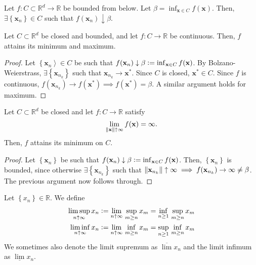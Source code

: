 \begin{prop}
    Let $f \colon C \subset \mathbb{R}^d \to \mathbb{R}$ be bounded from below. Let $\beta = \inf_{\mathbf{x} \in C} f(\mathbf{x})$. Then, $\exists \left\{ \mathbf{x}_n \right\} \in C$ such that $f(\mathbf{x}_n) \downarrow \beta$.  
\end{prop}

\begin{thm}
    Let $C \subset \mathbb{R}^d$ be closed and bounded, and let $f \colon C \to \mathbb{R}$ be continuous. Then, $f$ attains its minimum and maximum. 
\end{thm}
\begin{proof}
    Let $\left\{ \mathbf{x}_n \right\rangle \in C$ be such that $f(\mathbf{x}_n) \downarrow \beta \vcentcolon= \inf_{\mathbf{x} \in C} f(\mathbf{x})$. By Bolzano-Weierstrass, $\exists \left\{ \mathbf{x}_{n_k} \right\}$ such that $\mathbf{x}_{n_k} \to \mathbf{x}^*$. Since $C$ is closed, $\mathbf{x}^* \in C$. Since $f$ is continuous, $f(\mathbf{x}_{n_k}) \to f(\mathbf{x}^*) \implies f(\mathbf{x}^*) = \beta$. A similar argument holds for maximum.
\end{proof}

\begin{cor}
    Let $C \subset \mathbb{R}^d$ be closed and let $f \colon C \to \mathbb{R}$ satisfy 
    \[
        \lim_{\norm{\mathbf{x}} \uparrow \infty} f(\mathbf{x}) = \infty.
    \]
    Then, $f$ attains its minimum on $C$. 
\end{cor}
\begin{proof}
    Let $\left\{ \mathbf{x}_n \right\}$ be such that $f(\mathbf{x}_n) \downarrow \beta \vcentcolon= \inf_{\mathbf{x} \in C} f(\mathbf{x})$. Then, $\left\{ \mathbf{x}_n \right\}$ is bounded, since otherwise $\exists \left\{ \mathbf{x}_{n_k} \right\}$ such that $\norm{\mathbf{x}_{n_k}} \uparrow \infty \implies f(\mathbf{x}_{n_k}) \to \infty \neq \beta$. The previous argument now follows through.
\end{proof}

\begin{defn}
    Let $\left\{ x_n \right\} \in \mathbb{R}$. We define
    \begin{align*}
        \limsup_{n \uparrow \infty} x_n &\vcentcolon= \lim_{n \uparrow \infty} \, \sup_{m \geq n} x_m = \inf_{n \geq 1} \, \sup_{m \geq n} x_m \\
        \liminf_{n \uparrow \infty} x_n &\vcentcolon= \lim_{n \uparrow \infty} \, \inf_{m \geq n} x_m = \sup_{n \geq 1} \, \inf_{m \geq n} x_m
    \end{align*}
    We sometimes also denote the limit supremum as $\overline{\lim} x_n$ and the limit infimum as $\underline{\lim} x_n$.
\end{defn}


